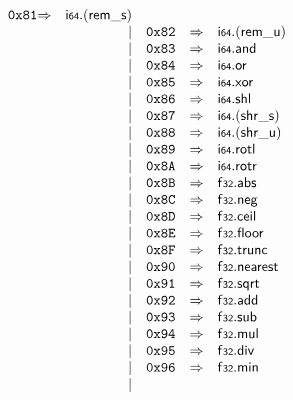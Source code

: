 $$\begin{array}{@{}l@{}rrlll@{}l@{}}
\mathtt{0x81} &\Rightarrow& \mathsf{i{\scriptstyle64}} . ({\mathsf{rem\_}}{\mathsf{s}}) \\ &&|&
\mathtt{0x82} &\Rightarrow& \mathsf{i{\scriptstyle64}} . ({\mathsf{rem\_}}{\mathsf{u}}) \\ &&|&
\mathtt{0x83} &\Rightarrow& \mathsf{i{\scriptstyle64}} . \mathsf{and} \\ &&|&
\mathtt{0x84} &\Rightarrow& \mathsf{i{\scriptstyle64}} . \mathsf{or} \\ &&|&
\mathtt{0x85} &\Rightarrow& \mathsf{i{\scriptstyle64}} . \mathsf{xor} \\ &&|&
\mathtt{0x86} &\Rightarrow& \mathsf{i{\scriptstyle64}} . \mathsf{shl} \\ &&|&
\mathtt{0x87} &\Rightarrow& \mathsf{i{\scriptstyle64}} . ({\mathsf{shr\_}}{\mathsf{s}}) \\ &&|&
\mathtt{0x88} &\Rightarrow& \mathsf{i{\scriptstyle64}} . ({\mathsf{shr\_}}{\mathsf{u}}) \\ &&|&
\mathtt{0x89} &\Rightarrow& \mathsf{i{\scriptstyle64}} . \mathsf{rotl} \\ &&|&
\mathtt{0x8A} &\Rightarrow& \mathsf{i{\scriptstyle64}} . \mathsf{rotr} \\ &&|&
\mathtt{0x8B} &\Rightarrow& \mathsf{f{\scriptstyle32}} . \mathsf{abs} \\ &&|&
\mathtt{0x8C} &\Rightarrow& \mathsf{f{\scriptstyle32}} . \mathsf{neg} \\ &&|&
\mathtt{0x8D} &\Rightarrow& \mathsf{f{\scriptstyle32}} . \mathsf{ceil} \\ &&|&
\mathtt{0x8E} &\Rightarrow& \mathsf{f{\scriptstyle32}} . \mathsf{floor} \\ &&|&
\mathtt{0x8F} &\Rightarrow& \mathsf{f{\scriptstyle32}} . \mathsf{trunc} \\ &&|&
\mathtt{0x90} &\Rightarrow& \mathsf{f{\scriptstyle32}} . \mathsf{nearest} \\ &&|&
\mathtt{0x91} &\Rightarrow& \mathsf{f{\scriptstyle32}} . \mathsf{sqrt} \\ &&|&
\mathtt{0x92} &\Rightarrow& \mathsf{f{\scriptstyle32}} . \mathsf{add} \\ &&|&
\mathtt{0x93} &\Rightarrow& \mathsf{f{\scriptstyle32}} . \mathsf{sub} \\ &&|&
\mathtt{0x94} &\Rightarrow& \mathsf{f{\scriptstyle32}} . \mathsf{mul} \\ &&|&
\mathtt{0x95} &\Rightarrow& \mathsf{f{\scriptstyle32}} . \mathsf{div} \\ &&|&
\mathtt{0x96} &\Rightarrow& \mathsf{f{\scriptstyle32}} . \mathsf{min} \\ &&|&

\end{array}$$
